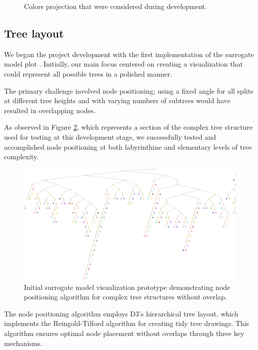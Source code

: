 \begin{figure}
    \caption{Colors projection that were considered during development.}
    \label{fig:colorsProjection}
\end{figure}

\subsection{Tree layout}

We began the project development with the first implementation of the surrogate model plot \cite{git1commit}. Initially, our main focus centered on creating a visualization that could represent all possible trees in a polished manner.

The primary challenge involved node positioning; using a fixed angle for all splits at different tree heights and with varying numbers of subtrees would have resulted in overlapping nodes.

As observed in Figure \ref{fig:earlyProtoypeDecisionTreeVisualization}, which represents a section of the complex tree structure used for testing at this development stage, we successfully tested and accomplished node positioning at both labyrinthine and elementary levels of tree complexity.

\begin{figure}
    \centering
    \includegraphics[width=\linewidth]{images/early protoype of decision tree visualization.png}
    \caption{Initial surrogate model visualization prototype demonstrating node positioning algorithm for complex tree structures without overlap.}
    \label{fig:earlyProtoypeDecisionTreeVisualization}
\end{figure}

The node positioning algorithm employs D3's hierarchical tree layout, which implements the Reingold-Tilford algorithm \cite{1702828} for creating tidy tree drawings. This algorithm ensures optimal node placement without overlaps through three key mechanisms.

